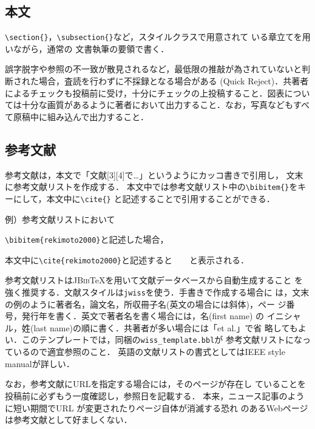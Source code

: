 \documentclass[twoside]{wiss}
\begin{document}
\subsection{本文}

\verb|\section{}|，\verb|\subsection{}|など，スタイルクラスで用意されて
いる章立てを用いながら，通常の \LaTeXe 文書執筆の要領で書く．

誤字脱字や参照の不一致が散見されるなど，最低限の推敲が為されていないと判断された場合，査読を行わずに不採録となる場合がある (Quick Reject)．共著者によるチェックも投稿前に受け，十分にチェックの上投稿すること．図表については十分な画質があるように著者において出力すること．なお，写真などもすべて原稿中に組み込んで出力すること．

\subsection{参考文献}
参考文献は，本文で「文献[3][4]で…」というようにカッコ書きで引用し，
文末に参考文献リストを作成する．
本文中では参考文献リスト中の\verb|\bibitem{}|をキーにして，本文中に\verb|\cite{}|
と記述することで引用することができる．

例）参考文献リストにおいて

\verb|\bibitem{rekimoto2000}|と記述した場合，

本文中に\verb|\cite{rekimoto2000}|と記述すると　\cite{rekimoto2000}　と表示される．

参考文献リストは\textsc{JBib}\TeX を用いて文献データベースから自動生成すること
を強く推奨する．文献スタイルは\verb|jwiss|を使う．手書きで作成する場合に
は，文末の例のように著者名，論文名，所収冊子名(英文の場合には斜体)，ペー
ジ番号，発行年を書く．英文で著者名を書く場合には，名(first name) の
イニシャル，姓(last name)の順に書く．共著者が多い場合には「et al.」で省
略してもよい．このテンプレートでは，同梱の\verb|wiss_template.bbl|が
参考文献リストになっているので適宜参照のこと．
英語の文献リストの書式としてはIEEE style manualが詳しい．

なお，参考文献にURLを指定する場合には，そのページが存在し
ていることを投稿前に必ずもう一度確認し，参照日を記載する．
本来，ニュース記事のように短い期間でURL が変更されたりページ自体が消滅する恐れ
のあるWebページは参考文献として好ましくない．
\end{document}

